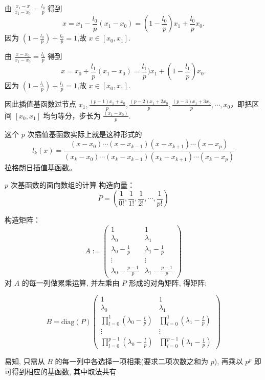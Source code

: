 \documentclass[12pt,a4paper]{article}
\begin{document}
由 $\frac{x_1 - x}{x_1 - x_0}=\frac{l_0}{p}$ 得到
$$
x=x_1-\frac{l_0}{p} (x_1 - x_0)=(1-\frac{l_0}{p})x_1 + \frac{l_0}{p} x_0.
$$
因为 $(1-\frac{l_0}{p}) + \frac{l_0}{p} =1$,故 $x\in [x_0,x_1].$

由 $\frac{x - x_0}{x_1 - x_0}=\frac{l_1}{p}$ 得到
$$
x=x_0+\frac{l_1}{p} (x_1 - x_0)=\frac{l_1}{p})x_1 + (1-\frac{l_1}{p})x_0.
$$
因为 $(1-\frac{l_1}{p}) + \frac{l_1}{p} = 1$,故 $x\in [x_0,x_1].$

因此插值基函数过节点 $x_1,\frac{(p-1)x_1 + x_0}{p},\frac{(p-2)x_1 + 2x_0}{p},\frac{(p-3)x_1 + 3x_0}{p},\cdots,x_0$，即把区间 $[x_0,x_1]$ 均匀等分，步长为 $\frac{(x_1-x_0)}{p}$.

这个 $p$ 次插值基函数实际上就是这种形式的
$$
l_k(x)=\frac{(x-x_0)\cdots(x-x_{k-1})(x-x_{k+1})\cdots(x - x_p)}{(x_k-x_0)\cdots(x_k-x_{k-1})(x_k-x_{k+1})\cdots(x_k-x_p)}
$$
拉格朗日插值基函数。

$p$ 次基函数的面向数组的计算
构造向量：
$$
P = ( \frac{1}{0!},  \frac{1}{1!}, \frac{1}{2!}, \cdots, \frac{1}{p!})
$$

构造矩阵：
$$
A :=                                                                            
\begin{pmatrix}  
1  &  1  \\
\lambda_0 & \lambda_1\\                                             
\lambda_0 - \frac{1}{p} & \lambda_1 - \frac{1}{p}\\   
\vdots & \vdots \\                                                     
\lambda_0 - \frac{p - 1}{p} & \lambda_1 - \frac{p - 1}{p}
\end{pmatrix}                                                                   
$$ 
对 $A$ 的每一列做累乘运算, 并左乘由 $P$ 形成的对角矩阵, 得矩阵:

$$
B = \mathrm{diag}(P)
\begin{pmatrix}
1 & 1\\
\lambda_0 & \lambda_1\\
\prod_{l=0}^{1}(\lambda_0 - \frac{l}{p}) & \prod_{l=0}^{1}(\lambda_1 - \frac{l}{p})\\
\vdots & \vdots \\
\prod_{l=0}^{p-1}(\lambda_0 - \frac{l}{p}) & \prod_{l=0}^{p-1}(\lambda_1 - \frac{l}{p}) 
\end{pmatrix}
$$

易知, 只需从 $B$ 的每一列中各选择一项相乘(要求二项次数之和为 $p$), 再乘以 $p^p$ 即可得到相应的基函数, 其中取法共有 
\end{document}

